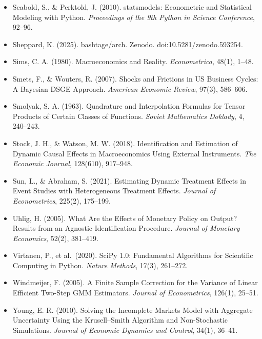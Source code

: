 \documentclass[11pt,letterpaper]{article}
\renewcommand{\_}{\pmunderscore\allowbreak}
\begin{document}
\begin{itemize}
\item
  Seabold, S., \& Perktold, J. (2010). statsmodels: Econometric and Statistical Modeling with Python. \emph{Proceedings of the 9th Python in Science Conference}, 92--96.
\item
  Sheppard, K. (2025). bashtage/arch. Zenodo. doi:10.5281/zenodo.593254.
\item
  Sims, C. A. (1980). Macroeconomics and Reality. \emph{Econometrica}, 48(1), 1--48.
\item
  Smets, F., \& Wouters, R. (2007). Shocks and Frictions in US Business Cycles: A Bayesian DSGE Approach. \emph{American Economic Review}, 97(3), 586--606.
\item
  Smolyak, S. A. (1963). Quadrature and Interpolation Formulas for Tensor Products of Certain Classes of Functions. \emph{Soviet Mathematics Doklady}, 4, 240--243.
\item
  Stock, J. H., \& Watson, M. W. (2018). Identification and Estimation of Dynamic Causal Effects in Macroeconomics Using External Instruments. \emph{The Economic Journal}, 128(610), 917--948.
\item
  Sun, L., \& Abraham, S. (2021). Estimating Dynamic Treatment Effects in Event Studies with Heterogeneous Treatment Effects. \emph{Journal of Econometrics}, 225(2), 175--199.
\item
  Uhlig, H. (2005). What Are the Effects of Monetary Policy on Output? Results from an Agnostic Identification Procedure. \emph{Journal of Monetary Economics}, 52(2), 381--419.
\item
  Virtanen, P., et al.~(2020). SciPy 1.0: Fundamental Algorithms for Scientific Computing in Python. \emph{Nature Methods}, 17(3), 261--272.
\item
  Windmeijer, F. (2005). A Finite Sample Correction for the Variance of Linear Efficient Two-Step GMM Estimators. \emph{Journal of Econometrics}, 126(1), 25--51.
\item
  Young, E. R. (2010). Solving the Incomplete Markets Model with Aggregate Uncertainty Using the Krusell--Smith Algorithm and Non-Stochastic Simulations. \emph{Journal of Economic Dynamics and Control}, 34(1), 36--41.
\end{itemize}
\end{document}

